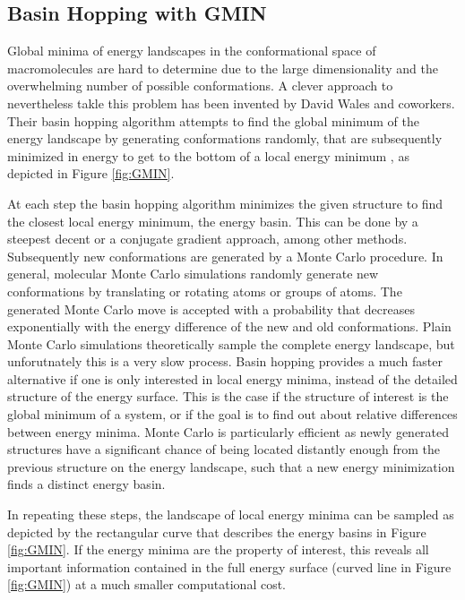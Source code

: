 \documentclass[english, a4paper, 12pt, titlepage, draft]{article}
\begin{document}



\subsection{Basin Hopping with GMIN}

Global minima of energy landscapes in the conformational space of macromolecules are hard to determine due to the large dimensionality and the overwhelming number of possible conformations.
A clever approach to nevertheless takle this problem has been invented by David Wales and coworkers.
Their basin hopping algorithm attempts to find the global minimum of the energy landscape by generating conformations randomly, that are subsequently minimized in energy to get to the bottom of a local energy minimum \cite{basinHopping}, as depicted in Figure \ref{fig:GMIN}.

At each step the basin hopping algorithm minimizes the given structure to find the closest local energy minimum, the energy basin.
This can be done by a steepest decent or a conjugate gradient approach, among other methods.
Subsequently new conformations are generated by a Monte Carlo procedure. 
In general, molecular Monte Carlo simulations randomly generate new conformations by translating or rotating atoms or groups of atoms.
The generated Monte Carlo move is accepted with a probability that decreases exponentially with the energy difference of the new and old conformations.
Plain Monte Carlo simulations theoretically sample the complete energy landscape, but unforutnately this is a very slow process.
Basin hopping provides a much faster alternative if one is only interested in local energy minima, instead of the detailed structure of the energy surface.
This is the case if the structure of interest is the global minimum of a system, or if the goal is to find out about relative differences between energy minima.
Monte Carlo is particularly efficient as newly generated structures have a significant chance of being located distantly enough from the previous structure on the energy landscape, such that a new energy minimization finds a distinct energy basin.

In repeating these steps, the landscape of local energy minima can be sampled as depicted by the rectangular curve that describes the energy basins in Figure \ref{fig:GMIN}.
If the energy minima are the property of interest, this reveals all important information contained in the full energy surface (curved line in Figure \ref{fig:GMIN}) at a much smaller computational cost.
\end{document}
